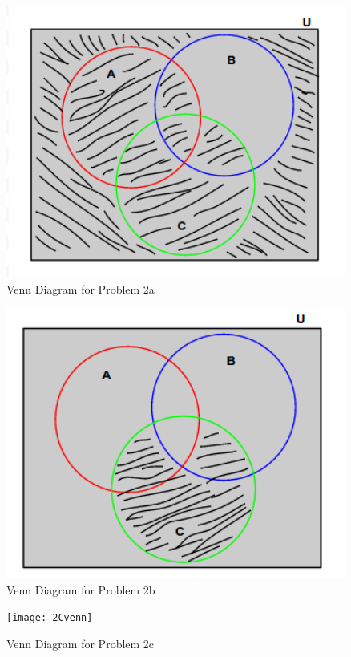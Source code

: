 \documentclass[a4paper,11pt]{article}
\begin{document}
  \begin{figure}
     \includegraphics[width=4.4in]{2Avenn}
   \caption{Venn Diagram for Problem 2a}
   \label{fig:tutorial}
  \end{figure} 

    \begin{figure}
     \includegraphics[width=4.4in]{2Bvenn}
   \caption{Venn Diagram for Problem 2b}
   \label{fig:tutorial}
  \end{figure} 

    \begin{figure}
     \texttt{[image: 2Cvenn]}
   \caption{Venn Diagram for Problem 2c}
   \label{fig:tutorial}
  \end{figure} 
\end{document}
